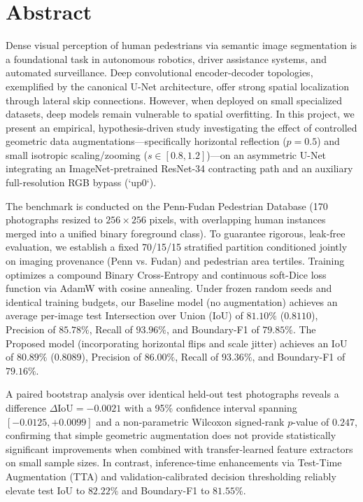 \documentclass[10pt,a4paper]{article}
\begin{document}
\section*{Abstract}
Dense visual perception of human pedestrians via semantic image segmentation is a foundational task in autonomous robotics, driver assistance systems, and automated surveillance. Deep convolutional encoder-decoder topologies, exemplified by the canonical U-Net architecture, offer strong spatial localization through lateral skip connections. However, when deployed on small specialized datasets, deep models remain vulnerable to spatial overfitting. In this project, we present an empirical, hypothesis-driven study investigating the effect of controlled geometric data augmentations---specifically horizontal reflection ($p=0.5$) and small isotropic scaling/zooming ($s \in [0.8, 1.2]$)---on an asymmetric U-Net integrating an ImageNet-pretrained ResNet-34 contracting path and an auxiliary full-resolution RGB bypass (`up0`).

The benchmark is conducted on the Penn-Fudan Pedestrian Database (170 photographs resized to $256 \times 256$ pixels, with overlapping human instances merged into a unified binary foreground class). To guarantee rigorous, leak-free evaluation, we establish a fixed 70/15/15 stratified partition conditioned jointly on imaging provenance (Penn vs. Fudan) and pedestrian area tertiles. Training optimizes a compound Binary Cross-Entropy and continuous soft-Dice loss function via AdamW with cosine annealing. Under frozen random seeds and identical training budgets, our Baseline model (no augmentation) achieves an average per-image test Intersection over Union (IoU) of $81.10\%$ ($0.8110$), Precision of $85.78\%$, Recall of $93.96\%$, and Boundary-F1 of $79.85\%$. The Proposed model (incorporating horizontal flips and scale jitter) achieves an IoU of $80.89\%$ ($0.8089$), Precision of $86.00\%$, Recall of $93.36\%$, and Boundary-F1 of $79.16\%$.

A paired bootstrap analysis over identical held-out test photographs reveals a difference $\Delta \text{IoU} = -0.0021$ with a 95\% confidence interval spanning $[-0.0125, +0.0099]$ and a non-parametric Wilcoxon signed-rank $p$-value of $0.247$, confirming that simple geometric augmentation does not provide statistically significant improvements when combined with transfer-learned feature extractors on small sample sizes. In contrast, inference-time enhancements via Test-Time Augmentation (TTA) and validation-calibrated decision thresholding reliably elevate test IoU to $82.22\%$ and Boundary-F1 to $81.55\%$.
\end{document}
